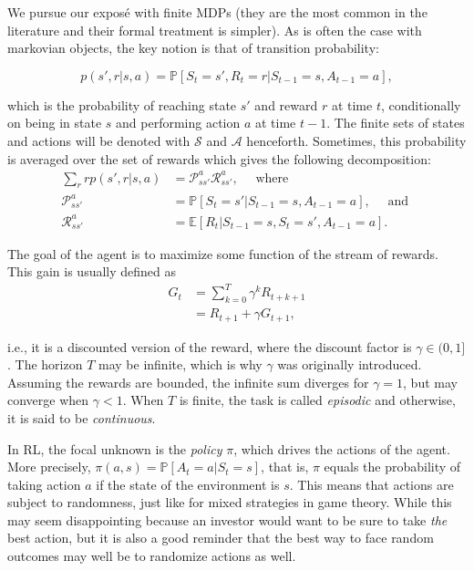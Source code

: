 \documentclass[]{krantz}
\theoremstyle{definition}
\theoremstyle{definition}
\theoremstyle{definition}
\theoremstyle{remark}
\begin{document}
We pursue our exposé with finite MDPs (they are the most common in the
literature and their formal treatment is simpler). As is often the case
with markovian objects, the key notion is that of transition
probability:

\begin{equation}
\label{eq:transprob}
p(s',r|s,a)=\mathbb{P}\left[S_t=s',R_t=r | S_{t-1}=s,A_{t-1}=a \right],
\end{equation}

which is the probability of reaching state \(s'\) and reward \(r\) at
time \(t\), conditionally on being in state \(s\) and performing action
\(a\) at time \(t-1\). The finite sets of states and actions will be
denoted with \(\mathcal{S}\) and \(\mathcal{A}\) henceforth. Sometimes,
this probability is averaged over the set of rewards which gives the
following decomposition: \begin{align}  \label{eq:transprob2}
\sum_r rp(s',r|s,a)&=\mathcal{P}_{ss'}^a \mathcal{R}_{ss'}^a, \quad \text{ where } \\
\mathcal{P}_{ss'}^a &=\mathbb{P}\left[S_t=s' | S_{t-1}=s,A_{t-1}=a \right],  \quad \text{ and } \nonumber \\
 \mathcal{R}_{ss'}^a &= \mathbb{E}\left[R_t | S_{t-1}=s,S_t=s', A_{t-1}=a \right]. \nonumber
\end{align}

The goal of the agent is to maximize some function of the stream of
rewards. This gain is usually defined as \begin{align}
G_t&=\sum_{k=0}^T\gamma^kR_{t+k+1} \nonumber \\   \label{eq:gain6}
&=R_{t+1} +\gamma G_{t+1},
\end{align}

i.e., it is a discounted version of the reward, where the discount
factor is \(\gamma \in (0,1]\). The horizon \(T\) may be infinite, which
is why \(\gamma\) was originally introduced. Assuming the rewards are
bounded, the infinite sum diverges for \(\gamma=1\), but may converge
when \(\gamma <1\). When \(T\) is finite, the task is called
\emph{episodic} and otherwise, it is said to be \emph{continuous}.

In RL, the focal unknown is the \emph{policy} \(\pi\), which drives the
actions of the agent. More precisely,
\(\pi(a,s)=\mathbb{P}[A_t=a|S_t=s]\), that is, \(\pi\) equals the
probability of taking action \(a\) if the state of the environment is
\(s\). This means that actions are subject to randomness, just like for
mixed strategies in game theory. While this may seem disappointing
because an investor would want to be sure to take \emph{the} best
action, but it is also a good reminder that the best way to face random
outcomes may well be to randomize actions as well.
\end{document}
